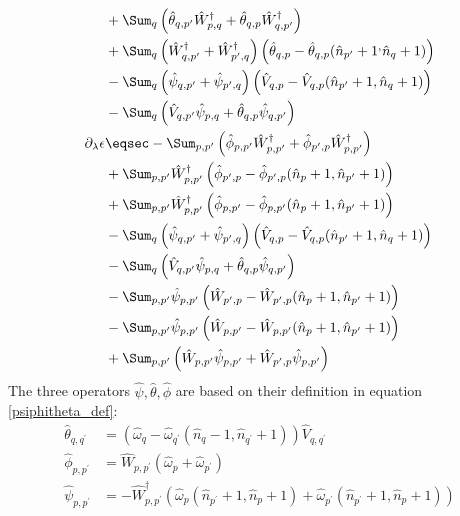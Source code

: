 \begin{appendix}
\begin{subequations}
\begin{align}
&+     \Sum_{q}\left(\hat\theta_{ q, p^\prime}\hat W_{p,q}^\dagger+\hat\theta_{ q, p}\hat W_{q,p^\prime}^\dagger\right)                      \nonumber\\
&+      \Sum_{q}\left(\hat W_{q,p^\prime}^\dagger+\hat W_{p^\prime,q}^\dagger\right) \left(\hat\theta_{ q,p}-\hat\theta_{ q,p}(\hat n_{p^\prime}+1^,\hat n_{q}+1)\right)                     \nonumber\\
&-      \Sum_{q}\left(\hat \psi_{q,p^\prime}+\hat \psi_{p^\prime,q}\right) \left(\hat V_{ q,p}-\hat V_{ q,p}(\hat n_{p^\prime}+1,\hat n_{q}+1)\right)                     \nonumber\\
&-      \Sum_{q}\left(\hat V_{ q, p^\prime}\hat \psi_{p,q}+\hat\theta_{ q, p}\hat \psi_{q,p^\prime}\right)                     \nonumber\\
\partial_\lambda\epsilon&\eqsec -\Sum_{p, p^\prime}\left( \hat\phi_{ p, p^\prime}\hat W_{p,p^\prime}^\dagger+ \hat\phi_{p^\prime,p}\hat W_{p,p^\prime}^\dagger\right) \\
&+\Sum_{p, p^\prime}\hat W_{p,p^\prime}^\dagger \left(\hat\phi_{p^\prime,p}-\hat\phi_{p^\prime,p}(\hat n_p+1,\hat n_{p^\prime}+1)\right) \nonumber\\
&+\Sum_{p, p^\prime}\hat W_{p,p^\prime}^\dagger \left(\hat\phi_{ p, p^\prime}-\hat\phi_{ p, p^\prime}(\hat n_p+1,\hat n_{p^\prime}+1)\right)\nonumber\\
&-\Sum_{q}\left(\hat \psi_{q,p^\prime}+\hat \psi_{p^\prime,q}\right) \left(\hat V_{ q,p}-\hat V_{ q,p}(\hat n_{p^\prime}+1,\hat n_{q}+1)\right)                           \nonumber\\
&-\Sum_{q}\left(\hat V_{ q, p^\prime}\hat \psi_{p,q}+\hat\theta_{ q, p}\hat \psi_{q,p^\prime}\right)                           \nonumber\\
&-\Sum_{p, p^\prime}\hat \psi_{p,p^\prime} \left(\hat W_{p^\prime,p}-\hat W_{p^\prime,p}(\hat n_p+1,\hat n_{p^\prime}+1)\right) \nonumber\\
&-\Sum_{p, p^\prime}\hat \psi_{p,p^\prime} \left(\hat W_{ p, p^\prime}-\hat W_{ p, p^\prime}(\hat n_p+1,\hat n_{p^\prime}+1)\right)\nonumber\\
&+\Sum_{p, p^\prime}\left( \hat W_{ p, p^\prime}\hat \psi_{p,p^\prime}+ \hat W_{p^\prime,p}\hat \psi_{p,p^\prime}\right)\nonumber
\end{align}
\end{subequations}
The three operators $\hat\psi,\hat\theta,\hat\phi$ are based on their definition in equation \ref{psiphitheta_def}:
\begin{align}
\hat\theta_{q,q^\prime}&=(\hat\omega_q-\hat\omega_{q^\prime}(\hat n_q-1,\hat n_{q^\prime}+1))\hat V_{q,q^\prime}\\
\hat\phi_{p,p^\prime}&=\hat W_{p,p^\prime}(\hat\omega_p+\hat\omega_{p^\prime})\\
\hat\psi_{p,p^\prime}&=-\hat W_{p,p^\prime}^\dagger (\hat\omega_p(\hat n_{p^\prime}+1,\hat n_p +1)+\hat\omega_{p^\prime}(\hat n_{p^\prime}+1,\hat n_p +1))
\end{align}

\end{appendix}
